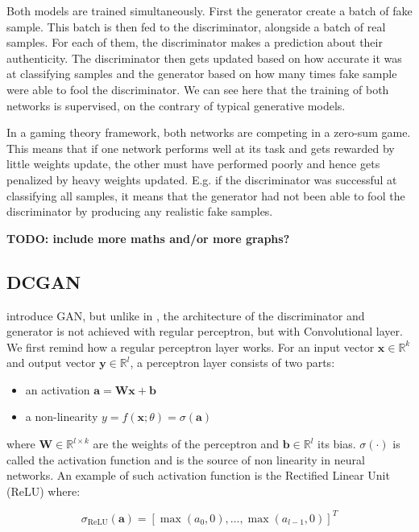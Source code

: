 \documentclass{article}
\begin{document}
Both models are trained simultaneously. First the generator create a batch of fake sample. This batch is then fed to the discriminator, alongside a batch of real samples. For each of them, the discriminator makes a prediction about their authenticity. The discriminator then gets updated based on how accurate it was at classifying samples and the generator based on how many times fake sample were able to fool the discriminator. We can see here that the training of both networks is supervised, on the contrary of typical generative models.

In a gaming theory framework, both networks are competing in a zero-sum game. This means that if one network performs well at its task and gets rewarded by little weights update, the other must have performed poorly and hence gets penalized by heavy weights updated. E.g. if the discriminator was successful at classifying all samples, it means that the generator had not been able to fool the discriminator by producing any realistic fake samples.  


\textbf{TODO: include more maths and/or more graphs?}

\subsection{DCGAN}

\cite{radford2015unsupervised} introduce GAN, but unlike in \cite{goodfellow2020generative}, the architecture of the discriminator and generator is not achieved with regular perceptron, but with Convolutional layer. We first remind how a regular perceptron layer works. For an input vector $\mathbf{x} \in \mathbb{R}^k$ and output vector $\mathbf{y} \in \mathbb{R}^l$, a perceptron layer consists of two parts:

\begin{itemize}
    \item an activation $\mathbf{a} = \mathbf{W} \mathbf{x} + \mathbf{b}$
    \item a non-linearity $y = f(\mathbf{x};\theta) = \sigma(\mathbf{a})$
\end{itemize}

where $\mathbf{W} \in \mathbb{R}^{l \times k}$ are the weights of the perceptron and $\mathbf{b} \in \mathbb{R}^l$ its bias. $\sigma(\cdot)$ is called the activation function and is the source of non linearity in neural networks. An example of such activation function is the Rectified Linear Unit (ReLU) where:

\begin{equation}
    \sigma_{\text{ReLU}}(\mathbf{a}) = [\max(a_0, 0), \dots, \max(a_{l-1}, 0)]^T
\end{equation}
\end{document}
